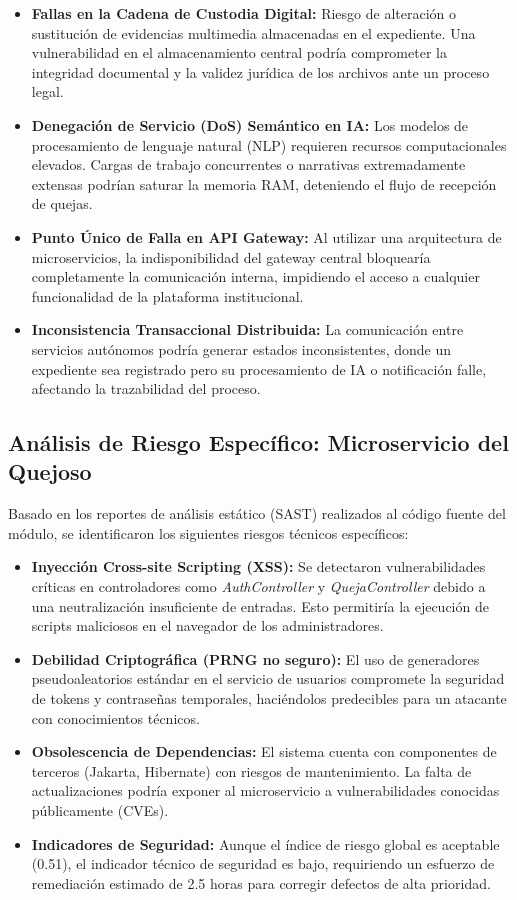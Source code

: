 \begin{itemize}
    \item \textbf{Fallas en la Cadena de Custodia Digital:} Riesgo de alteración o sustitución de evidencias multimedia almacenadas en el expediente. Una vulnerabilidad en el almacenamiento central podría comprometer la integridad documental y la validez jurídica de los archivos ante un proceso legal.
    \item \textbf{Denegación de Servicio (DoS) Semántico en IA:} Los modelos de procesamiento de lenguaje natural (NLP) requieren recursos computacionales elevados. Cargas de trabajo concurrentes o narrativas extremadamente extensas podrían saturar la memoria RAM, deteniendo el flujo de recepción de quejas.
    \item \textbf{Punto Único de Falla en API Gateway:} Al utilizar una arquitectura de microservicios, la indisponibilidad del gateway central bloquearía completamente la comunicación interna, impidiendo el acceso a cualquier funcionalidad de la plataforma institucional.
    \item \textbf{Inconsistencia Transaccional Distribuida:} La comunicación entre servicios autónomos podría generar estados inconsistentes, donde un expediente sea registrado pero su procesamiento de IA o notificación falle, afectando la trazabilidad del proceso.
\end{itemize}

\subsection{Análisis de Riesgo Específico: Microservicio del Quejoso}

Basado en los reportes de análisis estático (SAST) realizados al código fuente del módulo, se identificaron los siguientes riesgos técnicos específicos:

\begin{itemize}
    \item \textbf{Inyección Cross-site Scripting (XSS):} Se detectaron vulnerabilidades críticas en controladores como \textit{AuthController} y \textit{QuejaController} debido a una neutralización insuficiente de entradas. Esto permitiría la ejecución de scripts maliciosos en el navegador de los administradores.
    \item \textbf{Debilidad Criptográfica (PRNG no seguro):} El uso de generadores pseudoaleatorios estándar en el servicio de usuarios compromete la seguridad de tokens y contraseñas temporales, haciéndolos predecibles para un atacante con conocimientos técnicos.
    \item \textbf{Obsolescencia de Dependencias:} El sistema cuenta con componentes de terceros (Jakarta, Hibernate) con riesgos de mantenimiento. La falta de actualizaciones podría exponer al microservicio a vulnerabilidades conocidas públicamente (CVEs).
    \item \textbf{Indicadores de Seguridad:} Aunque el índice de riesgo global es aceptable (0.51), el indicador técnico de seguridad es bajo, requiriendo un esfuerzo de remediación estimado de 2.5 horas para corregir defectos de alta prioridad.
\end{itemize}

